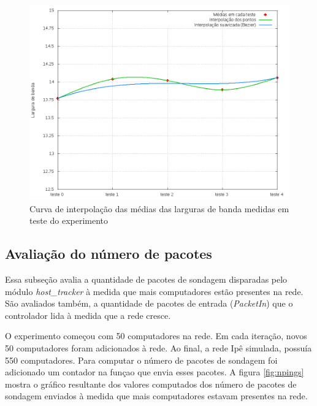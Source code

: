\begin{figure}[!htb]
    \centering
    \label{fig:host_tracker-bandwidth-growth}
    \includegraphics[width=\linewidth]{img/host_tracker-bandwidth-growth}
    \caption{Curva de interpolação das médias das larguras de banda medidas 
    em teste do experimento}
\end{figure}

\subsection{Avaliação do número de pacotes}

Essa subseção avalia a quantidade de pacotes de sondagem disparadas pelo 
módulo \emph{host\_tracker} à medida que mais computadores estão presentes
na rede.
São avaliados também, a quantidade de pacotes de entrada (\emph{PacketIn}) 
que o controlador lida à medida que a rede cresce.

O experimento começou com 50 computadores na rede.
Em cada iteração, novos 50 computadores foram adicionados à rede.
Ao final, a rede Ipê simulada, possuía 550 computadores.
Para computar o número de pacotes de sondagem foi adicionado um contador 
na funçao que envia esses pacotes.
A figura \ref{fig:npings} mostra o gráfico resultante dos valores computados
dos número de pacotes de sondagem enviados à medida que mais computadores 
estavam presentes na rede.

